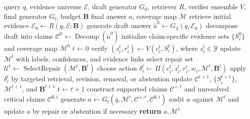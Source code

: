 \begin{algorithm}[t]
\caption{COVER-RAG Controller}
\label{alg:coverrag}
\begin{algorithmic}[1]
\REQUIRE query $q$, evidence universe $\mathcal{E}$, draft generator $G_{\mathrm{d}}$, retriever $R$, verifier ensemble $V$, final generator $G_{\mathrm{f}}$, budget $\mathbf{B}$
\ENSURE final answer $a$, coverage map $\mathcal{M}$
\STATE retrieve initial evidence $\mathcal{E}_0 \leftarrow R(q,\mathcal{E};\mathbf{B})$
\STATE generate draft answer $\tilde{a}^{0}\leftarrow G_{\mathrm{d}}(q,\mathcal{E}_0)$
\STATE decompose draft into claims $\mathcal{C}^{0}\leftarrow\operatorname{Decomp}(\tilde{a}^{0})$
\STATE initialize claim-specific evidence sets $\{S_i^{0}\}$ and coverage map $\mathcal{M}^{0}$
\STATE $t\leftarrow0$
        \STATE verify $(z_i^{t},r_i^{t})\leftarrow V(c_i^{t},S_i^{t})$, where $z_i^{t}\in\mathcal{Y}$
    \ENDFOR
    \STATE update $\mathcal{M}^{t}$ with labels, confidences, and evidence links
    \STATE select repair set $\mathcal{U}^{t}\leftarrow\operatorname{SelectRepair}(\mathcal{M}^{t},\mathbf{B}^{t})$
        \STATE choose action $\delta_i^{t}\leftarrow\Pi(c_i^{t},z_i^{t},r_i^{t},w_i,\mathcal{M}^{t},\mathbf{B}^{t})$
        \STATE apply $\delta_i^{t}$ by targeted retrieval, revision, removal, or abstention
    \ENDFOR
    \STATE update $\mathcal{C}^{t+1}$, $\{S_i^{t+1}\}$, $\mathcal{M}^{t+1}$, and $\mathbf{B}^{t+1}$
    \STATE $t\leftarrow t+1$
\ENDWHILE
\STATE construct supported claims $\mathcal{C}^{+,t}$ and unresolved critical claims $\mathcal{C}^{\emptyset,t}$
\STATE generate $a\leftarrow G_{\mathrm{f}}(q,\mathcal{M}^{t},\mathcal{C}^{+,t},\mathcal{C}^{\emptyset,t})$
\STATE audit $a$ against $\mathcal{M}^{t}$ and update $a$ by repair or abstention if necessary
\STATE \textbf{return} $a,\mathcal{M}^{t}$
\end{algorithmic}
\end{algorithm}

